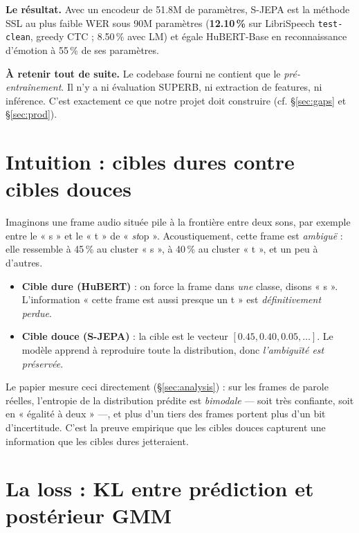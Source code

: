 \documentclass[11pt,a4paper]{article}
\begin{document}
\textbf{Le résultat.} Avec un encodeur de 51.8M de paramètres, S-JEPA est
la méthode SSL au plus faible WER sous 90M paramètres
(\textbf{12.10\,\%} sur LibriSpeech \texttt{test-clean}, greedy CTC ;
8.50\,\% avec LM) et égale HuBERT-Base en reconnaissance d'émotion à 55\,\%
de ses paramètres.

\begin{warnbox}
\textbf{À retenir tout de suite.} Le codebase fourni ne contient que le
\emph{pré-entraînement}. Il n'y a ni évaluation SUPERB, ni extraction de
features, ni inférence. C'est exactement ce que notre projet doit
construire (cf. §\ref{sec:gaps} et §\ref{sec:prod}).
\end{warnbox}

\section{Intuition : cibles dures contre cibles douces}

Imaginons une frame audio située pile à la frontière entre deux sons,
par exemple entre le « s » et le « t » de « \emph{st}op ». Acoustiquement,
cette frame est \emph{ambiguë} : elle ressemble à 45\,\% au cluster « s »,
à 40\,\% au cluster « t », et un peu à d'autres.

\begin{itemize}[leftmargin=*]
  \item \textbf{Cible dure (HuBERT)} : on force la frame dans \emph{une}
  classe, disons « s ». L'information « cette frame est aussi presque un t »
  est \emph{définitivement perdue}.
  \item \textbf{Cible douce (S-JEPA)} : la cible est le vecteur
  $[0.45, 0.40, 0.05, \dots]$. Le modèle apprend à reproduire toute la
  distribution, donc \emph{l'ambiguïté est préservée}.
\end{itemize}

Le papier mesure ceci directement (§\ref{sec:analysis}) : sur les frames
de parole réelles, l'entropie de la distribution prédite est
\emph{bimodale} --- soit très confiante, soit en « égalité à deux » ---,
et plus d'un tiers des frames portent plus d'un bit d'incertitude. C'est
la preuve empirique que les cibles douces capturent une information que
les cibles dures jetteraient.

\section{La loss : KL entre prédiction et postérieur GMM}
\end{document}
